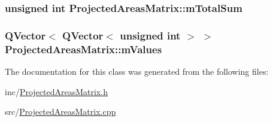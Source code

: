 \hypertarget{class_projected_areas_matrix_a5cc3d0fedfb1071ea8849511050e3379}{
\subsubsection[{m\+Total\+Sum}]{\setlength{\rightskip}{0pt plus 5cm}unsigned int Projected\+Areas\+Matrix\+::m\+Total\+Sum\hspace{0.3cm}{\ttfamily [private]}}}\label{class_projected_areas_matrix_a5cc3d0fedfb1071ea8849511050e3379}
\hypertarget{class_projected_areas_matrix_ac47120ea675fc0153e7ee8a05d4a7ac6}{
\subsubsection[{m\+Values}]{\setlength{\rightskip}{0pt plus 5cm}Q\+Vector$<$ Q\+Vector$<$ unsigned int $>$ $>$ Projected\+Areas\+Matrix\+::m\+Values\hspace{0.3cm}{\ttfamily [private]}}}\label{class_projected_areas_matrix_ac47120ea675fc0153e7ee8a05d4a7ac6}


The documentation for this class was generated from the following files\+:\begin{DoxyCompactItemize}
\item 
inc/\hyperlink{_projected_areas_matrix_8h}{Projected\+Areas\+Matrix.\+h}\item 
src/\hyperlink{_projected_areas_matrix_8cpp}{Projected\+Areas\+Matrix.\+cpp}\end{DoxyCompactItemize}
